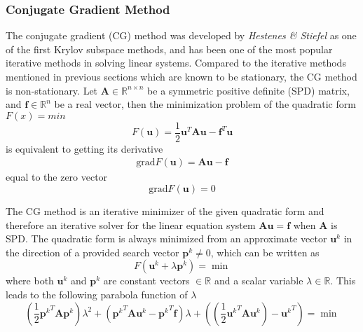 \subsubsection{Conjugate Gradient Method}
The conjugate gradient (CG) method was developed by \textit{Hestenes \& Stiefel} \citep{hestenes1952methods} as one of the first Krylov subspace methods, and has been one of the most popular iterative methods in solving linear systems. Compared to the iterative methods mentioned in previous sections which are known to be stationary, the CG method is non-stationary. Let $\boldsymbol{A} \in \mathbb{R}^{n\times n}$ be a symmetric positive definite (SPD) matrix, and $\boldsymbol{f} \in \mathbb{R}^n$ be a real vector, then the minimization problem of the quadratic form $F(x) = min$
\begin{equation}
    F(\boldsymbol{u}) = \frac{1}{2}\boldsymbol{u}^T\boldsymbol{A}\boldsymbol{u} - \boldsymbol{f}^T\boldsymbol{u}
\end{equation}
is equivalent to getting its derivative 
\begin{align}
    \text{grad} F(\boldsymbol{u}) = \boldsymbol{Au - f}
\end{align}
equal to the zero vector
\begin{equation}
    \text{grad} F(\boldsymbol{u}) = 0
    \label{eqn:cg_grad}
\end{equation}

The CG method is an iterative minimizer of the given quadratic form and therefore an iterative solver for the linear equation system $\boldsymbol{Au=f}$ when $\boldsymbol{A}$ is SPD. The quadratic form is always minimized from an approximate vector $\boldsymbol{u}^k$ in the direction of a provided search vector $\boldsymbol{p}^k \neq 0$, which can be written as
\begin{equation}
    F(\boldsymbol{u}^k + \lambda\boldsymbol{p}^k) = \min
\end{equation}
where both $\boldsymbol{u}^k$ and $\boldsymbol{p}^k$ are constant vectors $\in \mathbb{R}$ and a scalar variable $\lambda \in \mathbb{R}$. This leads to the following parabola function of $\lambda$
\begin{equation}
    (\frac{1}{2}{\boldsymbol{p}^{k}}^{T} \boldsymbol{A} \boldsymbol{p}^k) \lambda^2 + ({\boldsymbol{p}^{k}}^{T} \boldsymbol{A} \boldsymbol{u}^k - {\boldsymbol{p}^{k}}^T\boldsymbol{f})\lambda \nonumber
    + ((\frac{1}{2}{\boldsymbol{u}^{k}}^{T} \boldsymbol{A} \boldsymbol{u}^k) - {\boldsymbol{u}^k}^T) = \min
\end{equation}

